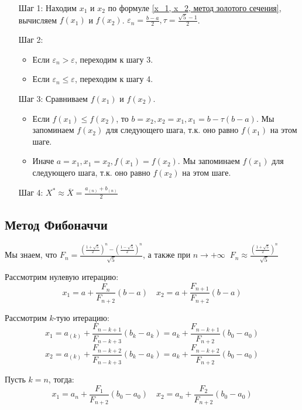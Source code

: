 \begin{itemize}
    \item [Шаг 1:] Находим \(x_1\) и \(x_2\) по формуле \eqref{x_1, x_2, метод золотого сечения}, вычисляем \(f(x_1)\) и \(f(x_2)\). \(\varepsilon_n = \frac{b - a}{2}, \tau = \frac{\sqrt{5} - 1}{2} \).
    \item [Шаг 2:]
          \begin{itemize}
              \item Если \(\varepsilon_n > \varepsilon\), переходим к шагу 3.
              \item Если \(\varepsilon_n \leq \varepsilon\), переходим к шагу 4.
          \end{itemize}
    \item [Шаг 3:] Сравниваем \(f(x_1)\) и \(f(x_2)\).
          \begin{itemize}
              \item Если \(f(x_1) \leq f(x_2)\), то \(b = x_2, x_2 = x_1, x_1 = b - \tau (b - a)\). Мы запоминаем \(f(x_2)\) для следующего шага, т.к. оно равно \(f(x_1)\) на этом шаге.
              \item Иначе \(a = x_1, x_1 = x_2, f(x_1) = f(x_2)\). Мы запоминаем \(f(x_1)\) для следующего шага, т.к. оно равно \(f(x_2)\) на этом шаге.
          \end{itemize}
    \item [Шаг 4:] \(X^* \approx \overline X = \frac{a_{(n)} + b_{(n)}}{2}\)
\end{itemize}

\subsection{Метод Фибоначчи}

Мы знаем, что \(F_n = \frac{\left( \frac{1 + \sqrt{5}}{2} \right)^n - \left( \frac{1 - \sqrt{5}}{2} \right)^n}{\sqrt{5}} \), а также при \(n \to +\infty\ \) \(F_n \approx \frac{\left( \frac{1 + \sqrt{5}}{2} \right)^n}{\sqrt{5}}\)

Рассмотрим нулевую итерацию:
\[x_1 = a + \frac{F_n}{F_{n + 2}} (b - a) \quad x_2 = a + \frac{F_{n+1}}{F_{n + 2}} (b - a)\]

Рассмотрим \(k\)-тую итерацию:
\[x_1 = a_{(k)} + \frac{F_{n - k + 1}}{F_{n - k + 3}} (b_k - a_k) = a_k + \frac{F_{n - k + 1}}{F_{n + 2}} (b_0 - a_0)\]
\[x_2 = a_{(k)} + \frac{F_{n - k + 2}}{F_{n - k + 3}} (b_k - a_k) = a_k + \frac{F_{n - k + 2}}{F_{n + 2}} (b_0 - a_0)\]

Пусть \(k = n\), тогда:
\[x_1 = a_n + \frac{F_1}{F_{n + 2}} (b_0 - a_0) \quad x_2 = a_n + \frac{F_2}{F_{n + 2}} (b_0 - a_0)\]

